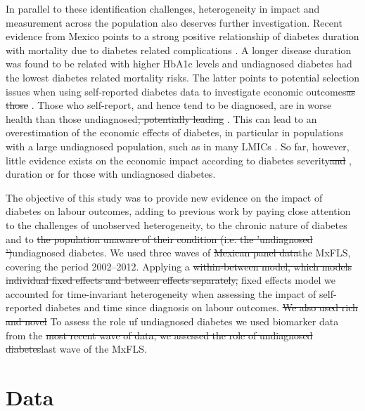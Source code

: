 \documentclass[12pt,english]{article}
\providecommand{\DIFaddtex}[1]{{\protect\color{blue}#1}} %
\providecommand{\DIFdeltex}[1]{{\protect\color{red}\sout{#1}}}                      %
\providecommand{\DIFaddbegin}{} %
\providecommand{\DIFaddend}{} %
\providecommand{\DIFdelbegin}{} %
\providecommand{\DIFdelend}{} %
\providecommand{\DIFadd}[1]{\texorpdfstring{\DIFaddtex{#1}}{#1}} %
\providecommand{\DIFdel}[1]{\texorpdfstring{\DIFdeltex{#1}}{}} %
\begin{document}
In parallel to these identification challenges, heterogeneity in impact and measurement across the population also deserves further investigation. Recent evidence from Mexico points to a strong positive relationship of diabetes duration with mortality due to diabetes related complications \parencite{Herrington2018}. A longer disease duration was found to be related with higher \ac{HbA1c} levels and undiagnosed diabetes had the lowest diabetes related mortality risks. The latter points to potential selection issues when using self-reported diabetes data to investigate economic outcomes\DIFdelbegin \DIFdel{as those }\DIFdelend \DIFaddbegin \DIFadd{. Those }\DIFaddend who self-report, and hence tend to be diagnosed, are in worse health than those undiagnosed\DIFdelbegin \DIFdel{, potentially leading }\DIFdelend \DIFaddbegin \DIFadd{. This can lead }\DIFaddend to an overestimation of the economic effects of diabetes, in particular in populations with a large undiagnosed population, such as in many \acp{LMIC} \parencite{Beagley2014}. So far, however, little evidence exists on the economic impact according to diabetes severity\DIFdelbegin \DIFdel{and }\DIFdelend \DIFaddbegin \DIFadd{, }\DIFaddend duration or for those with undiagnosed diabetes. 

The objective of this study was to provide new evidence on the impact of diabetes on labour outcomes, adding to previous work by paying close attention to the challenges of unobserved heterogeneity, to the chronic nature of diabetes and to \DIFdelbegin \DIFdel{the population unaware of their condition (i.e. the 'undiagnosed ')}\DIFdelend \DIFaddbegin \DIFadd{undiagnosed diabetes}\DIFaddend . We used three waves of \DIFdelbegin \DIFdel{Mexican panel data}\DIFdelend \DIFaddbegin \DIFadd{the }\ac{MxFLS}\DIFaddend , covering the period 2002--2012. Applying a \DIFdelbegin \DIFdel{within-between model, which  models individual fixed effects and between effects separately, }\DIFdelend \DIFaddbegin \DIFadd{fixed effects model }\DIFaddend we accounted for time-invariant heterogeneity when assessing the impact of self-reported diabetes and time since diagnosis on labour outcomes. \DIFdelbegin \DIFdel{We also used rich and novel }\DIFdelend \DIFaddbegin \DIFadd{To assess the role uf undiagnosed diabetes we used }\DIFaddend biomarker data from the \DIFdelbegin \DIFdel{most recent wave of data, we assessed the role of undiagnosed diabetes}\DIFdelend \DIFaddbegin \DIFadd{last wave of the }\ac{MxFLS}\DIFaddend .

\section{\label{sec:Data}Data}
\end{document}

